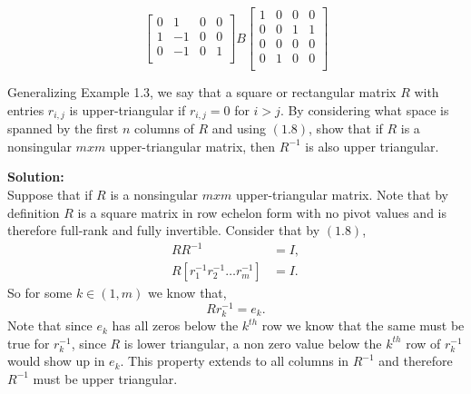 \documentclass[12pt]{article}
\makeatletter
\theoremstyle{homework}
\newenvironment{exercise}[1]
{\def\@currentlabel{#1}\exercisecore}
{\endexercisecore}
\newcommand{\localhead}[1]{\par\smallskip\noindent\textbf{#1}\nobreak\\}%
\newcommand\solution{\localhead{Solution:}}
\makeatother
\begin{document}
\begin{exercise}{4}
\begin{enumerate}
\begin{equation*}
\begin{bmatrix}
            0 & 1 & 0 & 0\\
            1 & -1 & 0 & 0\\
            0 & -1 & 0 & 1\\
        \end{bmatrix}
        B
        \begin{bmatrix}
            1 & 0 & 0 & 0\\
            0 & 0 & 1 & 1\\
            0 & 0 & 0 & 0\\
            0 & 1 & 0 & 0\\
        \end{bmatrix}
        \end{equation*}
    \end{enumerate}



\end{exercise}


\begin{exercise}{1.3} Generalizing Example 1.3, we say that a square or 
    rectangular matrix $R$ with entries $r_{i,j}$ is upper-triangular if $r_{i,j} = 0$
    for $i>j$. By considering what space is spanned by the first $n$ columns of $R$ and using $(1.8)$, 
    show that if $R$ is a nonsingular $mxm$ upper-triangular matrix, then $R^{-1}$ is also upper triangular. \\
    \solution Suppose that if $R$ is a nonsingular $mxm$ upper-triangular matrix. Note that by definition $R$ is 
    a square matrix in row echelon form with no pivot values and is therefore full-rank and fully invertible. Consider that by $(1.8)$, 
    \begin{align*}
        RR^{-1} &= I, \\
        R[r^{-1}_1 r^{-1}_2 \dots r^{-1}_m] &= I.
    \end{align*}
    So for some $k \in (1,m)$ we know that, 
    \begin{equation*}
        Rr^{-1}_k = e_k.
    \end{equation*}
    Note that since $e_k$ has all zeros below the $k^{th}$ row we know that the same must be true for $r^{-1}_k$,
    since $R$ is lower triangular, a non zero value below the $k^{th}$ row of $r^{-1}_k$ would show up in $e_k$. This property extends to 
    all columns in $R^{-1}$ and therefore $R^{-1}$ must be upper triangular. 



\end{exercise}
\end{document}
